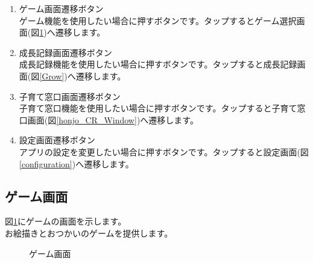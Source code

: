 \documentclass[a4j]{jarticle}
\begin{document}
\begin{enumerate}
  \renewcommand{\labelenumi}{\textcircled{\scriptsize \theenumi}}
  \item ゲーム画面遷移ボタン\\
        ゲーム機能を使用したい場合に押すボタンです。タップするとゲーム選択画面(図\ref{game})へ遷移します。
  \item 成長記録画面遷移ボタン\\
        成長記録機能を使用したい場合に押すボタンです。タップすると成長記録画面(図\ref{Grow})へ遷移します。
  \item 子育て窓口画面遷移ボタン\\
        子育て窓口機能を使用したい場合に押すボタンです。タップすると子育て窓口画面(図\ref{honjo_CR_Window})へ遷移します。
  \item 設定画面遷移ボタン\\
        アプリの設定を変更したい場合に押すボタンです。タップすると設定画面(図\ref{configuration})へ遷移します。
\end{enumerate}

\subsection{ゲーム画面}
図\ref{game}にゲームの画面を示します。\\
お絵描きとおつかいのゲームを提供します。

\begin{figure}[H]
    \begin{center}
    \caption {ゲーム画面}
    \label{game}
    \end{center}
\end{figure}
\end{document}
